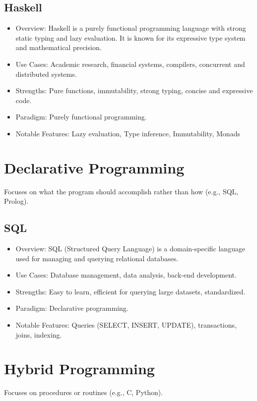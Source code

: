 \documentclass[openany]{book} %
\begin{document}
\subsection{Haskell}
\begin{itemize}
\item Overview: Haskell is a purely functional programming language with strong static typing and lazy evaluation. It is known for its expressive type system and mathematical precision.
\item Use Cases: Academic research, financial systems, compilers, concurrent and distributed systems.
\item Strengths: Pure functions, immutability, strong typing, concise and expressive code.
\item Paradigm: Purely functional programming.
\item Notable Features: Lazy evaluation, Type inference, Immutability, Monads
\end{itemize}

\section{Declarative Programming}
Focuses on what the program should accomplish rather than how (e.g., SQL, Prolog).
\subsection{SQL}
\begin{itemize}
\item Overview: SQL (Structured Query Language) is a domain-specific language used for managing and querying relational databases.
\item Use Cases: Database management, data analysis, back-end development.
\item Strengths: Easy to learn, efficient for querying large datasets, standardized.
\item Paradigm: Declarative programming.
\item Notable Features: Queries (SELECT, INSERT, UPDATE), transactions, joins, indexing.
\end{itemize}

\section{Hybrid Programming}
Focuses on procedures or routines (e.g., C, Python).
\end{document}
